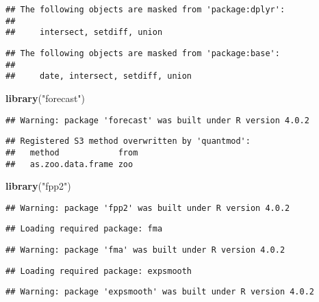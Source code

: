 \documentclass[
]{article}
\newenvironment{Shaded}{\begin{snugshade}}{\end{snugshade}}
\newcommand{\KeywordTok}[1]{\textcolor[rgb]{0.13,0.29,0.53}{\textbf{#1}}}
\newcommand{\NormalTok}[1]{#1}
\newcommand{\StringTok}[1]{\textcolor[rgb]{0.31,0.60,0.02}{#1}}
\begin{document}
\begin{verbatim}
## The following objects are masked from 'package:dplyr':
## 
##     intersect, setdiff, union
\end{verbatim}

\begin{verbatim}
## The following objects are masked from 'package:base':
## 
##     date, intersect, setdiff, union
\end{verbatim}

\begin{Shaded}
\begin{Highlighting}[]
\KeywordTok{library}\NormalTok{(}\StringTok{"forecast"}\NormalTok{)}
\end{Highlighting}
\end{Shaded}

\begin{verbatim}
## Warning: package 'forecast' was built under R version 4.0.2
\end{verbatim}

\begin{verbatim}
## Registered S3 method overwritten by 'quantmod':
##   method            from
##   as.zoo.data.frame zoo
\end{verbatim}

\begin{Shaded}
\begin{Highlighting}[]
\KeywordTok{library}\NormalTok{(}\StringTok{"fpp2"}\NormalTok{)}
\end{Highlighting}
\end{Shaded}

\begin{verbatim}
## Warning: package 'fpp2' was built under R version 4.0.2
\end{verbatim}

\begin{verbatim}
## Loading required package: fma
\end{verbatim}

\begin{verbatim}
## Warning: package 'fma' was built under R version 4.0.2
\end{verbatim}

\begin{verbatim}
## Loading required package: expsmooth
\end{verbatim}

\begin{verbatim}
## Warning: package 'expsmooth' was built under R version 4.0.2
\end{verbatim}
\end{document}
